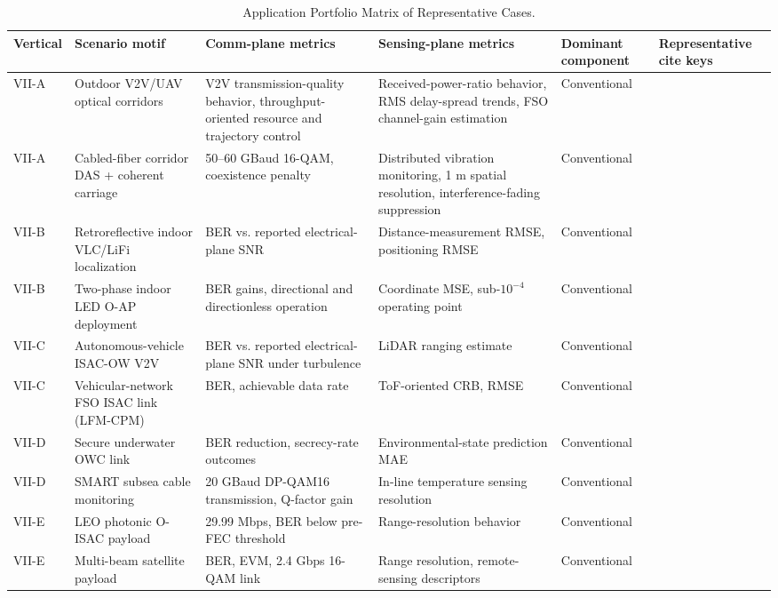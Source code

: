\begin{table}[!t]
\caption{Application Portfolio Matrix of Representative Cases.}
\label{tab:app-portfolio}
\centering
\scriptsize
\setlength{\tabcolsep}{3pt}
\begin{tabular}{p{} p{} p{} p{} p{} p{}}
\toprule
Vertical & Scenario motif & Comm-plane metrics & Sensing-plane metrics & Dominant component & Representative cite keys \\
\midrule
 VII-A & Outdoor V2V/UAV optical corridors & V2V transmission-quality behavior, throughput-oriented resource and trajectory control & Received-power-ratio behavior, RMS delay-spread trends, FSO channel-gain estimation & Conventional & \cite{O_ISAC_003,O_ISAC_005} \\
 VII-A & Cabled-fiber corridor DAS + coherent carriage & 50--60 GBaud 16-QAM, coexistence penalty & Distributed vibration monitoring, 1 m spatial resolution, interference-fading suppression & Conventional & \cite{O_ISAC_038,O_ISAC_074} \\
 VII-B & Retroreflective indoor VLC/LiFi localization & BER vs. reported electrical-plane SNR & Distance-measurement RMSE, positioning RMSE & Conventional & \cite{O_ISAC_011} \\
 VII-B & Two-phase indoor LED O-AP deployment & BER gains, directional and directionless operation & Coordinate MSE, sub-$10^{-4}$ operating point & Conventional & \cite{O_ISAC_108} \\
 VII-C & Autonomous-vehicle ISAC-OW V2V & BER vs. reported electrical-plane SNR under turbulence & LiDAR ranging estimate & Conventional & \cite{O_ISAC_060} \\
 VII-C & Vehicular-network FSO ISAC link (LFM-CPM) & BER, achievable data rate & ToF-oriented CRB, RMSE & Conventional & \cite{O_ISAC_055} \\
 VII-D & Secure underwater OWC link & BER reduction, secrecy-rate outcomes & Environmental-state prediction MAE & Conventional & \cite{O_ISAC_127} \\
 VII-D & SMART subsea cable monitoring & 20 GBaud DP-QAM16 transmission, Q-factor gain & In-line temperature sensing resolution & Conventional & \cite{O_ISAC_220} \\
 VII-E & LEO photonic O-ISAC payload & 29.99 Mbps, BER below pre-FEC threshold & Range-resolution behavior & Conventional & \cite{O_ISAC_187} \\
 VII-E & Multi-beam satellite payload & BER, EVM, 2.4 Gbps 16-QAM link & Range resolution, remote-sensing descriptors & Conventional & \cite{O_ISAC_195} \\
\bottomrule
\end{tabular}
\end{table}

